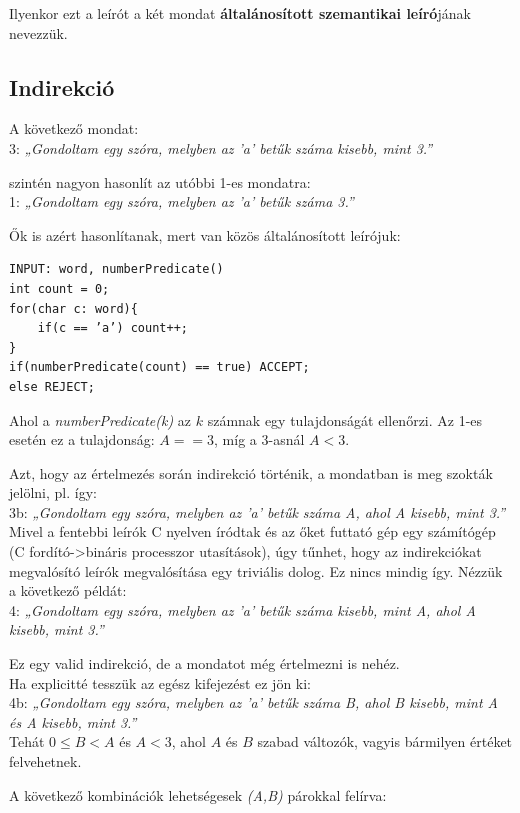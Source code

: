 \documentclass[12pt]{report}
\theoremstyle{definition}
\begin{document}
Ilyenkor ezt a leírót a két mondat \textbf{általánosított szemantikai leíró}jának nevezzük.
 
\subsection{Indirekció}
A következő mondat:\\
3: \textit{„Gondoltam egy szóra, melyben az ’a’ betűk száma kisebb, mint 3.”}

szintén nagyon hasonlít az utóbbi 1-es mondatra:\\
1: \textit{„Gondoltam egy szóra, melyben az ’a’ betűk száma 3.”}

Ők is azért hasonlítanak, mert van közös általánosított leírójuk:

\begin{verbatim}
INPUT: word, numberPredicate()
int count = 0;
for(char c: word){
	if(c == ’a’) count++;
}
if(numberPredicate(count) == true) ACCEPT;
else REJECT;
\end{verbatim}

Ahol a \textit{numberPredicate(k)} az $k$ számnak egy tulajdonságát ellenőrzi. Az 1-es esetén ez a tulajdonság: $A == 3$, míg a 3-asnál $A < 3$.

Azt, hogy az értelmezés során indirekció történik, a mondatban is meg szokták jelölni, pl. így:\\
3b: \textit{„Gondoltam egy szóra, melyben az ’a’ betűk száma A, ahol A kisebb, mint 3.”}\\

Mivel a fentebbi leírók C nyelven íródtak és az őket futtató gép egy számítógép (C fordító->bináris processzor utasítások), úgy tűnhet, hogy az indirekciókat megvalósító leírók megvalósítása egy triviális dolog. Ez nincs mindig így. Nézzük a következő példát:\\
4: \textit{„Gondoltam egy szóra, melyben az ’a’ betűk száma kisebb, mint A, ahol A kisebb, mint 3.”}

Ez egy valid indirekció, de a mondatot még értelmezni is nehéz.\\

Ha explicitté tesszük az egész kifejezést ez jön ki:\\
4b: \textit{„Gondoltam egy szóra, melyben az ’a’ betűk száma B, ahol B kisebb, mint A és A kisebb, mint 3.”}\\
Tehát $0 \leq B < A$ és $A < 3$, ahol $A$ és $B$ szabad változók, vagyis bármilyen értéket felvehetnek.

A következő kombinációk lehetségesek \textit{(A,B)} párokkal felírva:
\end{document}
